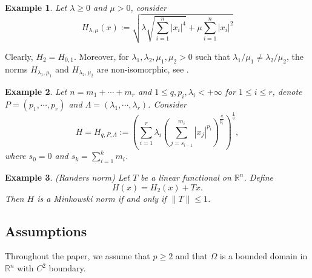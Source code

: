 \documentclass[11pt]{amsart}
\newtheorem{example}{Example}[section]
\newcommand{\rn}{\mathbb{R}^{n}}
\newcommand{\R}{\mathbb{R}}
\numberwithin{equation}{section}
\begin{document}
   \begin{example}
       Let $\lambda\geq 0$ and $\mu>0$, consider 
       \begin{equation*}
           H_{\lambda,\mu}(x):=\sqrt{\lambda \sqrt{\sum_{i=1}^{n}|x_{i}|^{4}}+\mu\sum_{i=1}^{n}|x_{i}|^{2}}
       \end{equation*}
   \end{example}
Clearly, $H_{2}=H_{0,1}$. Moreover, for $\lambda_{1},\lambda_{2},\mu_{1},\mu_{2}>0$ such that $\lambda_{1}/\mu_{1}\neq \lambda_{2}/\mu_{2}$, the norms $H_{\lambda_{1},\mu_{1}}$ and $H_{\lambda_{2},\mu_{2}}$ are non-isomorphic, see \cite{MezeiVas2019}.
\begin{example}
    Let $n=m_{1}+\cdots +m_{r}$ and $1\leq q,p_{i},\lambda_{i}<+\infty$ for $1\leq i\leq r$, denote $P=\left(p_{1},\cdots,p_{r}\right)$ and $\Lambda=\left(\lambda_{1},\cdots,\lambda_{r}\right)$. Consider 
    \begin{equation*}
        H=H_{q,P,\Lambda}:=\left(\displaystyle \sum_{i=1}^{r}\lambda_{i}\left(\sum_{j=s_{i-1}}^{m_{i}}|x_{j}|^{p_{i}}\right)^{\frac{q}{p_{i}}}\right)^{\frac{1}{q}},
    \end{equation*}
   where $s_{0}=0$ and $s_{k}=\displaystyle\sum_{i=1}^{k}m_{i}$.
\end{example}
\begin{example}(Randers norm)\cite[Example 1.2.2]{Shenbook2001}
    Let $T$ be a linear functional on $\rn$. Define
    \begin{equation*}
        H(x)=H_{2}(x)+Tx.
    \end{equation*}
    Then $H$ is a Minkowski norm if and only if $\|T\|\leq 1$.
\end{example}


\subsection{Assumptions}\label{assumptions}
Throughout the paper, we assume that $p\geq 2$ and that $\Omega$ is a bounded domain in $\R^{n}$ with $C^{2}$ boundary.
\end{document}
